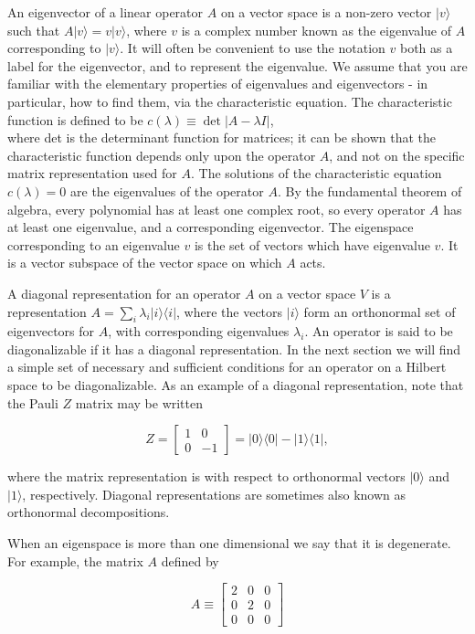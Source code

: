 An eigenvector of a linear operator $A$ on a vector space is a non-zero vector $|v\rangle$ such that $A|v\rangle=v|v\rangle$, where $v$ is a complex number known as the eigenvalue of $A$ corresponding to $|v\rangle$. It will often be convenient to use the notation $v$ both as a label for the eigenvector, and to represent the eigenvalue. We assume that you are familiar with the elementary properties of eigenvalues and eigenvectors - in particular, how to find them, via the characteristic equation. The characteristic function is defined to be $c(\lambda) \equiv \operatorname{det}|A-\lambda I|$,\\
where det is the determinant function for matrices; it can be shown that the characteristic function depends only upon the operator $A$, and not on the specific matrix representation used for $A$. The solutions of the characteristic equation $c(\lambda)=0$ are the eigenvalues of the operator $A$. By the fundamental theorem of algebra, every polynomial has at least one complex root, so every operator $A$ has at least one eigenvalue, and a corresponding eigenvector. The eigenspace corresponding to an eigenvalue $v$ is the set of vectors which have eigenvalue $v$. It is a vector subspace of the vector space on which $A$ acts.

A diagonal representation for an operator $A$ on a vector space $V$ is a representation $A=\sum_{i} \lambda_{i}|i\rangle\langle i|$, where the vectors $|i\rangle$ form an orthonormal set of eigenvectors for $A$, with corresponding eigenvalues $\lambda_{i}$. An operator is said to be diagonalizable if it has a diagonal representation. In the next section we will find a simple set of necessary and sufficient conditions for an operator on a Hilbert space to be diagonalizable. As an example of a diagonal representation, note that the Pauli $Z$ matrix may be written

$$
Z=\left[\begin{array}{rr}
1 & 0 \\
0 & -1
\end{array}\right]=|0\rangle\langle 0|-| 1\rangle\langle 1|,
$$

where the matrix representation is with respect to orthonormal vectors $|0\rangle$ and $|1\rangle$, respectively. Diagonal representations are sometimes also known as orthonormal decompositions.

When an eigenspace is more than one dimensional we say that it is degenerate. For example, the matrix $A$ defined by

$$
A \equiv\left[\begin{array}{lll}
2 & 0 & 0 \\
0 & 2 & 0 \\
0 & 0 & 0
\end{array}\right]
$$

